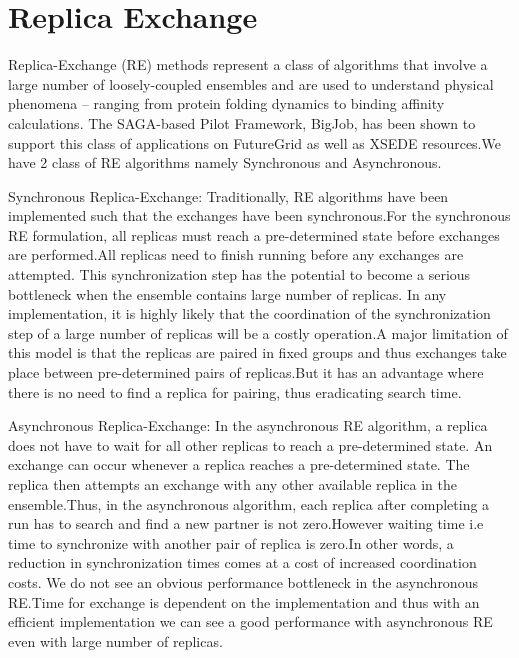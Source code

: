 \documentclass[]{paper}
\begin{document}
\section{Replica Exchange}

Replica-Exchange (RE) methods represent a class of algorithms that involve a large number of loosely-coupled ensembles and are used to understand physical phenomena – ranging from protein folding dynamics to binding affinity calculations. The SAGA-based Pilot Framework, BigJob, has been shown to support this class of applications on FutureGrid as well as XSEDE resources.We have 2 class of RE algorithms namely Synchronous and Asynchronous.

Synchronous Replica-Exchange:
Traditionally, RE algorithms have been implemented such that the exchanges have been synchronous.For the synchronous RE formulation, all replicas must reach a pre-determined 
state before exchanges are performed.All replicas need to finish running before any exchanges are attempted. This synchronization step has the potential to become a serious 
bottleneck when the ensemble contains large number of replicas. In any implementation, it is highly likely that the coordination of the synchronization step of a large number 
of replicas will be a costly operation.A major limitation of this model is that the replicas are paired in fixed groups and thus exchanges take place between pre-determined 
pairs of replicas.But it has an advantage where there is no need to find a replica for pairing, thus eradicating search time.

Asynchronous Replica-Exchange:
In the asynchronous RE algorithm, a replica does not have to wait for all other replicas to reach a pre-determined state. An exchange can occur whenever a replica reaches a pre-determined state. The replica then attempts an exchange with any other available replica in the ensemble.Thus, in the asynchronous algorithm, each replica after completing a run has to search and find a new partner is not zero.However waiting time i.e time to synchronize with another pair of replica is zero.In other words, a reduction in synchronization times comes at a cost of increased coordination costs. We do not see an  obvious performance bottleneck in the asynchronous RE.Time for exchange is dependent on the implementation and thus with an efficient implementation we can see a good performance with asynchronous RE even with large number of replicas.
\end{document}
